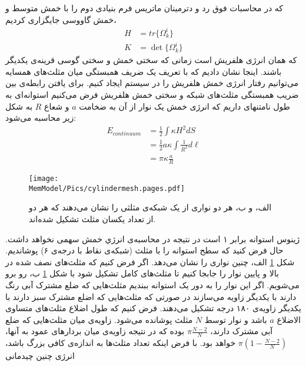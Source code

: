 که در محاسبات فوق رد
 و دترمینان ماتریس فرم بنیادی دوم را با خمش متوسط و خمش گاووسی جایگزاری کردیم،
\begin{equation}
\begin{aligned}
H&=tr\{\Omega_k^i\}\\
K&=\det\{\Omega_k^i\}
\end{aligned}
\end{equation} 
که همان انرژی هلفریش است زمانی که سختی خمش و سختی گوسی قرینه‌ی یکدیگر باشند. اینجا نشان دادیم که با تعریف یک ضریف همبستگی میان مثلث‌های همسایه می‌توانیم رفتار انرژی خمش هلفریش را در سیستم ایجاد کنیم. برای یافتن رابطه‌ی بین ضریب همبستگی مثلث‌های شبکه و سختی خمش هلفریش فرض می‌کنیم استوانه‌ای به طول نامتنهای داریم که انرژی خمش یک نوار از آن به ضخامت
$a$
و شعاع
$R$
به شکل زیر محاسبه می‌شود:
\begin{equation}
\begin{aligned}
E_{continuum}&=\frac{1}{2}\int \kappa H^2dS \\
&=\frac{1}{2}a\kappa\int \frac{1}{R^2}d\ell \\
&=\pi\kappa\frac{a}{R}
\end{aligned}
\label{eq:cylindercontinuum}
\end{equation} 

\begin{figure}[h]
\begin{center}
\texttt{[image: \\MemModel/Pics/cylindermesh.pages.pdf]}
\caption{
الف، و ب، هر دو نواری از یک شبکه‌ی مثلثی را نشان می‌دهند که هر دو از تعداد یکسان مثلث تشکیل شده‌اند. 
}
\label{fig:cylindermesh}
\end{center}
\end{figure}



ژینوس استوانه برابر ۱ است در نتیجه‌ در محاسبه‌ی انرژي خمش سهمی نخواهد داشت. حال فرض کنید که سطح استوانه را با مثلث (شبکه‌ی نقاط با درجه‌ی ۶) پوشاندیم. شکل
\ref{fig:cylindermesh}
الف، چنین نواری را نشان می‌دهد. اگر فرض کنیم که مثلث‌های نصف شده در بالا و پایین نوار را جابجا کنیم تا مثلث‌های کامل تشکیل شود با شکل
\ref{fig:cylindermesh}
ب، رو برو می‌شویم. اگر این نوار را به دور یک استوانه ببندیم مثلث‌هایی که ضلع مشترک آبی رنگ دارند با یکدیگر زاویه می‌سازند در صورتی که مثلث‌هایی که اضلع مشترک  سبز دارند با یکدیگر زاویه‌ی ۱۸۰ درجه تشکیل می‌دهند. فرض کنیم که طول اضلاع مثلث‌های متساوی الاضلاع 
$a$
 باشد و نوار توسط 
 $N$
 مثلث پوشانده می‌شود. زاویه‌ی میان مثلث‌هایی که ضلع آبی مشترک دارند،
 $\pi\frac{N-2}{N}$
بوده که در نتیجه زاویه‌ی میان بردار‌های عمود به آنها،
 $\pi(1-\frac{N-2}{N})$
خواهد بود. با فرض اینکه تعداد مثلث‌ها به اندازه‌ی کافی بزرگ باشد، انرژی چنین چیدمانی

